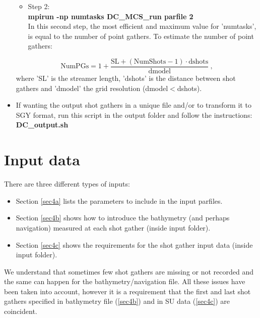 \documentclass[11pt, oneside]{article}   	%
\begin{document}
\begin{itemize}
\begin{itemize}
	
	 \item Step 2:\\ 
 	\textbf{mpirun -np numtasks DC\_MCS\_run parfile 2}\\
	In this second step, the most efficient and maximum value for 'numtasks', is equal to the number of point gathers. To estimate the number of point gathers:
 \end{itemize}

\begin{equation}
	\text{NumPGs} =1+ \frac{\text{SL} + (\text{NumShots} -1) \cdot \text{dshots}}{\text{dmodel}}~, 
\end{equation}
where 'SL' is the streamer length, 'dshots' is the distance between shot gathers and 'dmodel' the grid resolution (dmodel$<$dshots). 

 \item If wanting the output shot gathers in a unique file and/or to transform it to SGY format, run this script in the output folder and follow the instructions:\\
 \textbf{DC\_output.sh}
 \end{itemize}

\section{Input data}\label{sec4}
There are three different types of inputs: 
\begin{itemize}
\item Section \ref{sec4a} lists the parameters to include in the input parfiles. 
\item Section \ref{sec4b} shows how to introduce the bathymetry (and perhaps navigation) measured at each shot gather (inside input folder).
\item Section \ref{sec4c} shows the requirements for the shot gather input data (inside input folder). 
\end{itemize}
We understand that sometimes few shot gathers are missing or not recorded and the same can happen for the bathymetry/navigation file. All these issues have been taken into account, however it is a requirement that the first and last shot gathers specified in bathymetry file (\ref{sec4b}) and in SU data (\ref{sec4c}) are coincident.
\end{document}
